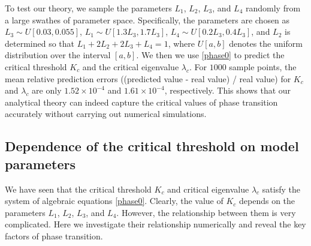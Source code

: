 \documentclass[a4paper,11pt]{article}
\begin{document}
To test our theory, we sample the parameters $L_1$, $L_2$, $L_3$, and $L_4$ randomly from a large swathes of parameter space. Specifically, the parameters are chosen as $L_3 \sim U[0.03, 0.055]$, $L_1 \sim U[1.3 L_3, 1.7 L_3]$, $L_4 \sim U[0.2 L_3, 0.4 L_3]$, and $L_2$ is determined so that $L_1 + 2 L_2 + 2 L_3 + L_4 = 1$, where $U[a,b]$ denotes the uniform distribution over the interval $[a,b]$. We then we use \eqref{phase0} to predict the critical threshold $K_c$ and the critical eigenvalue $\lambda_c$. For $1000$ sample points, the mean relative prediction errors ((predicted value - real value) / real value) for $K_c$ and $\lambda_c$ are only $1.52 \times 10^{-4}$ and $1.61 \times 10^{-4}$, respectively. This shows that our analytical theory can indeed capture the critical values of phase transition accurately without carrying out numerical simulations.

\subsection{Dependence of the critical threshold on model parameters}
We have seen that the critical threshold $K_c$ and critical eigenvalue $\lambda_c$ satisfy the system of algebraic equations \eqref{phase0}. Clearly, the value of $K_c$ depends on the parameters $L_1$, $L_2$, $L_3$, and $L_4$. However, the relationship between them is very complicated. Here we investigate their relationship numerically and reveal the key factors of phase transition.
\end{document}
